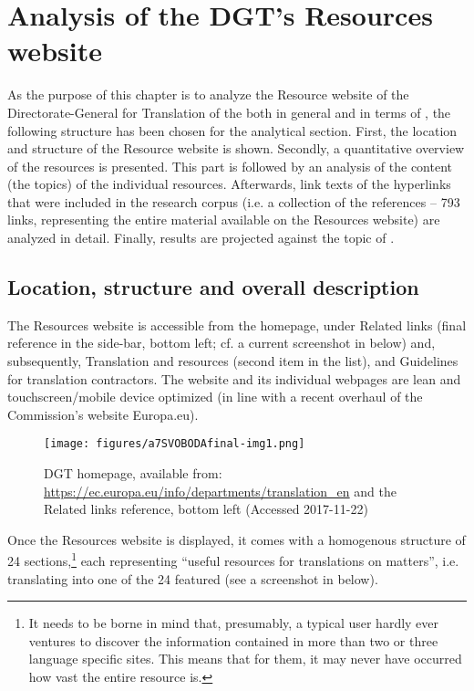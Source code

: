 \documentclass[output=paper]{langsci/langscibook}
\begin{document}
\newpage
\section{Analysis of the DGT’s Resources website}\label{sec:svoboda:4}


As the purpose of this chapter is to analyze the Resource website of the Direc\-tor\-ate-General for Translation of the  both in general and in terms of , the following structure has been chosen for the analytical section. First, the location and structure of the Resource website is shown. Secondly, a quantitative overview of the resources is presented. This part is followed by an analysis of the content (the topics) of the individual resources. Afterwards, link texts of the hyperlinks that were included in the research corpus (i.e. a collection of the references – 793 links, representing the entire material available on the Resources website) are analyzed in detail. Finally, results are projected against the topic of .

\subsection{Location, structure and overall description}\label{sec:svoboda:4.1}

 
The Resources website is accessible from the  homepage, under Related links (final reference in the side-bar, bottom left; cf. a current screenshot in  below) and, subsequently, Translation and  resources (second item in the list), and Guidelines for translation contractors. The  website and its individual webpages are lean and touchscreen/mobile device optimized (in line with a recent overhaul of the Commission’s website Europa.eu). 

\begin{figure}
\caption{DGT homepage, available from: \url{https://ec.europa.eu/info/departments/translation_en} and the Related links reference, bottom left (Accessed 2017-11-22)}
\label{fig:svoboda:1}
\texttt{[image: figures/a7SVOBODAfinal-img1.png]}
\end{figure}

 

 
Once the Resources website is displayed, it comes with a homogenous structure of 24 sections,\footnote{It needs to be borne in mind that, presumably, a typical user hardly ever ventures to discover the information contained in more than two or three language specific sites. This means that for them, it may never have occurred how vast the entire resource is.} each representing “useful resources for translations on  matters”, i.e.  translating into one of the 24   featured (see a screenshot in  below).
\end{document}
